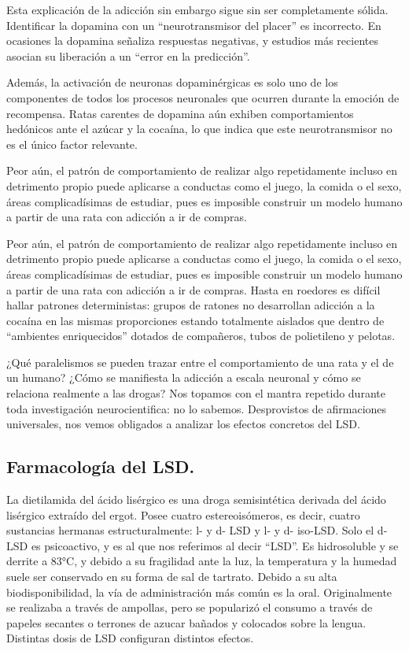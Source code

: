 Esta explicación de la adicción sin embargo sigue sin ser completamente sólida. Identificar la dopamina con un \enquote{neurotransmisor del placer} es incorrecto. En ocasiones la dopamina señaliza respuestas negativas, y estudios más recientes asocian su liberación a un \enquote{error en la predicción}.

Además, la activación de neuronas dopaminérgicas es solo uno de los componentes de todos los procesos neuronales que ocurren durante la emoción de recompensa. Ratas carentes de dopamina aún exhiben comportamientos hedónicos ante el azúcar y la cocaína, lo que indica que este neurotransmisor no es el único factor relevante.

Peor aún, el patrón de comportamiento de realizar algo repetidamente incluso en detrimento propio puede aplicarse a conductas como el juego, la comida o el sexo, áreas complicadísimas de estudiar, pues es imposible construir un modelo humano a partir de una rata con adicción a ir de compras.

Peor aún, el patrón de comportamiento de realizar algo repetidamente incluso en detrimento propio puede aplicarse a conductas como el juego, la comida o el sexo, áreas complicadísimas de estudiar, pues es imposible construir un modelo humano a partir de una rata con adicción a ir de compras. Hasta en roedores es difícil hallar patrones deterministas: grupos de ratones no desarrollan adicción a la cocaína en las mismas proporciones estando totalmente aislados que dentro de \enquote{ambientes enriquecidos} dotados de compañeros, tubos de polietileno y pelotas.

¿Qué paralelismos se pueden trazar entre el comportamiento de una rata y el de un humano? ¿Cómo se manifiesta la adicción a escala neuronal y cómo se relaciona realmente a las drogas? Nos topamos con el mantra repetido durante toda investigación neurocientifica: no lo sabemos. Desprovistos de afirmaciones universales, nos vemos obligados a analizar los efectos concretos del LSD.

\newpage

\subsection{Farmacología del LSD.}

La dietilamida del ácido lisérgico es una droga semisintética derivada del ácido lisérgico extraído del ergot. Posee cuatro estereoisómeros, es decir, cuatro sustancias hermanas estructuralmente: l- y d- LSD y l- y d- iso-LSD. Solo el d-LSD es psicoactivo, y es al que nos referimos al decir \enquote{LSD}. Es hidrosoluble y se derrite a 83°C, y debido a su fragilidad ante la luz, la temperatura y la humedad suele ser conservado en su forma de sal de tartrato. Debido a su alta biodisponibilidad, la vía de administración más común es la oral. Originalmente se realizaba a través de ampollas, pero se popularizó el consumo a través de papeles secantes o terrones de azucar bañados y colocados sobre la lengua. Distintas dosis de LSD configuran distintos efectos.


